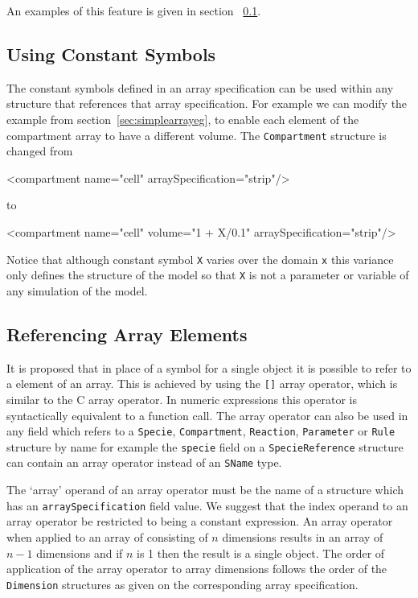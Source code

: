 \documentclass{cekarticle}
\begin{document}
An examples of this feature is given in section ~\ref{sec:useconsts}.

\subsection{Using Constant Symbols}
\label{sec:useconsts}

The constant symbols defined in an array specification can be
used within any structure that references that array
specification.  For example we can
modify the example from section~\ref{sec:simplearrayeg}, to
enable each element of the compartment array to have a different
volume. The \texttt{Compartment} structure is changed from
\begin{example}
<compartment name="cell" arraySpecification="strip"/>
\end{example}
to
\begin{example}
<compartment name="cell" volume="1 + X/0.1" arraySpecification="strip"/>
\end{example}

Notice that although constant symbol \texttt{X} varies over the
domain \texttt{x} this variance only defines the structure of the
model so that \texttt{X} is not a parameter or variable of any
simulation of the model.

\subsection{Referencing Array Elements}

It is proposed that in place of a symbol for a single object it
is possible to refer to a element of an array.  This is achieved
by using the \texttt{[]} array operator, which is similar to the
C array operator.  In numeric expressions this operator is
syntactically equivalent to a function call. The array operator
can also be used in any field which refers to a \texttt{Specie},
\texttt{Compartment}, \texttt{Reaction}, \texttt{Parameter} or
\texttt{Rule} structure by name for example the \texttt{specie}
field on a \texttt{SpecieReference} structure can contain an
array operator instead of an \texttt{SName} type.

The `array' operand of an array operator must be the name of a
structure which has an \texttt{arraySpecification} field value.
We suggest that the index operand to an array operator be
restricted to being a constant expression.  An array operator
when applied to an array of consisting of $n$ dimensions results
in an array of $n-1$ dimensions and if $n$ is 1 then the result
is a single object. The order of application of the array
operator to array dimensions follows the order of the
\texttt{Dimension} structures as given on the corresponding array
specification.
\end{document}
